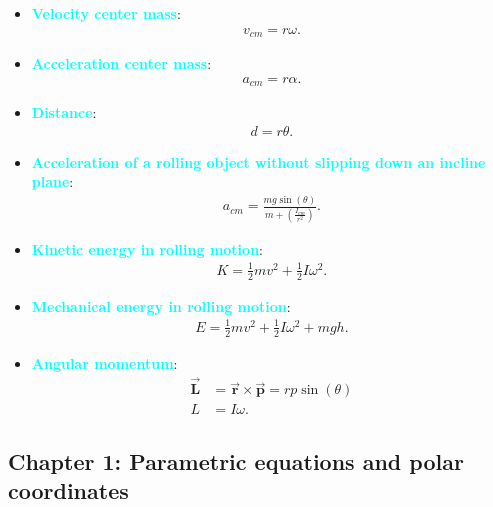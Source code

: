 \documentclass{report}
\begin{document}
\begin{itemize}
        \item \textbf{\textcolor{cyan}{Velocity center mass}}:
            \begin{align*}
                v_{cm} = r\omega
            .\end{align*}
        \item \textbf{\textcolor{cyan}{Acceleration center mass}}:
            \begin{align*}
                a_{cm} = r\alpha
            .\end{align*}
        \item \textbf{\textcolor{cyan}{Distance}}:
            \begin{align*}
                d = r\theta 
            .\end{align*}
        \item \textbf{\textcolor{cyan}{Acceleration of a rolling object without slipping down an incline plane}}:
            \begin{align*}
                a_{cm} = \frac{mg\sin{\left(\theta \right)}}{m + \left(\frac{I_{cm}}{r^{2}}\right)}
            .\end{align*}
        \item \textbf{\textcolor{cyan}{Kinetic energy in rolling motion}}:
            \begin{align*}
                K = \frac{1}{2}mv^{2} + \frac{1}{2}I\omega^{2}
            .\end{align*}
        \item \textbf{\textcolor{cyan}{Mechanical energy in rolling motion}}:
            \begin{align*}
                E  = \frac{1}{2}mv^{2} + \frac{1}{2}I\omega^{2} + mgh
            .\end{align*}
        \item \textbf{\textcolor{cyan}{Angular momentum}}:
            \begin{align*}
                \vec{\mathbf{L}} &= \vec{\mathbf{r}} \times \vec{\mathbf{p}} = rp\sin{\left(\theta \right)} \\
                L &= I\omega
            .\end{align*}
    \end{itemize}

    \pagebreak 

    \bigbreak \noindent 
    \subsection{Chapter 1: Parametric equations and polar coordinates}
\end{document}
